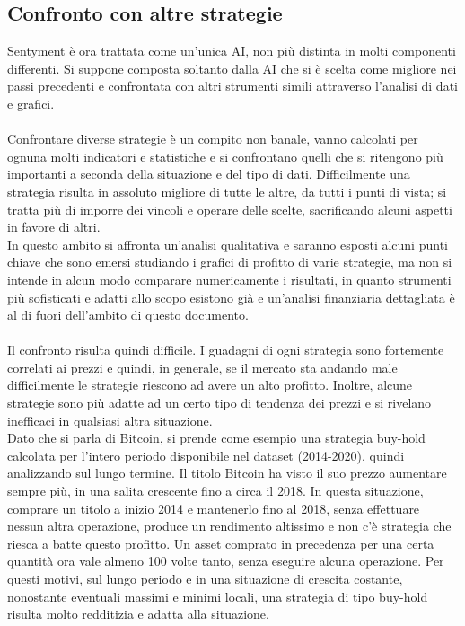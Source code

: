 \documentclass[a4paper,12pt]{report}
\begin{document}
\begin{fig}
\section{Confronto con altre strategie}
Sentyment è ora trattata come un'unica AI, non più distinta in molti componenti differenti. Si suppone composta soltanto dalla AI che si è scelta come migliore nei passi precedenti e confrontata con altri strumenti simili attraverso l'analisi di dati e grafici.\\~\\
Confrontare diverse strategie è un compito non banale, vanno calcolati per ognuna molti indicatori e statistiche e si confrontano quelli che si ritengono più importanti a seconda della situazione e del tipo di dati. Difficilmente una strategia risulta in assoluto migliore di tutte le altre, da tutti i punti di vista; si tratta più di imporre dei vincoli e operare delle scelte, sacrificando alcuni aspetti in favore di altri.\\ In questo ambito si affronta un'analisi qualitativa e saranno esposti alcuni punti chiave che sono emersi studiando i grafici di profitto di varie strategie, ma non si intende in alcun modo comparare numericamente i risultati, in quanto strumenti più sofisticati e adatti allo scopo esistono già e un'analisi finanziaria dettagliata è al di fuori dell'ambito di questo documento.\\~\\ Il confronto risulta quindi difficile. I guadagni di ogni strategia sono fortemente correlati ai prezzi e quindi, in generale, se il mercato sta andando male difficilmente le strategie riescono ad avere un alto profitto. Inoltre, alcune strategie sono più adatte ad un certo tipo di tendenza dei prezzi e si rivelano inefficaci in qualsiasi altra situazione.\\ Dato che si parla di Bitcoin, si prende come esempio una strategia buy-hold calcolata per l'intero periodo disponibile nel dataset (2014-2020), quindi analizzando sul lungo termine. Il titolo Bitcoin ha visto il suo prezzo aumentare sempre più, in una salita crescente fino a circa il 2018. In questa situazione, comprare un titolo a inizio 2014 e mantenerlo fino al 2018, senza effettuare nessun altra operazione, produce un rendimento altissimo e non c'è strategia che riesca a batte questo profitto. Un asset comprato in precedenza per una certa quantità ora vale almeno 100 volte tanto, senza eseguire alcuna operazione. Per questi motivi, sul lungo periodo e in una situazione di crescita costante, nonostante eventuali massimi e minimi locali, una strategia di tipo buy-hold risulta molto redditizia e adatta alla situazione.

\end{fig}
\end{document}
